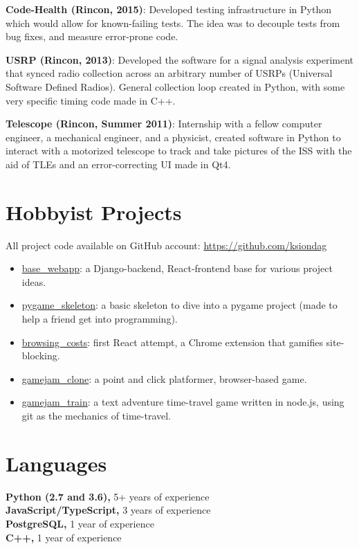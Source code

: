\documentclass{res}
\begin{document}
\begin{resume}
  {\bf Code-Health (Rincon, 2015)}: Developed  testing infrastructure in Python which would allow for 
  known-failing tests. The idea was to decouple tests from bug fixes, and measure error-prone code.

  {\bf USRP (Rincon, 2013)}: Developed the software for a signal analysis experiment that synced radio collection across
  an arbitrary number of USRPs (Universal Software Defined Radios). General collection loop created in Python,
  with some very specific timing code made in C++.

  {\bf Telescope (Rincon, Summer 2011)}: Internship with a fellow computer engineer, a mechanical engineer, and a
  physicist, created software in Python to interact with a motorized telescope to track
  and take pictures of the ISS with the aid of TLEs and an error-correcting UI made in Qt4.
\vspace{0.1in}
    
 
\section{Hobbyist Projects}
All project code available on GitHub account: \url{https://github.com/ksiondag}
  \begin{itemize}
    \item \href{https://github.com/ksiondag/base_webapp}{base\_webapp}: a Django-backend, React-frontend
    base for various project ideas.
    \item \href{https://github.com/ksiondag/pygame_skeleton}{pygame\_skeleton}: a basic skeleton to dive
    into a pygame project (made to help a friend get into programming).
    \item \href{https://github.com/ksiondag/browsing_costs}{browsing\_costs}: first React attempt, a
    Chrome extension that gamifies site-blocking.
    \item \href{https://github.com/ksiondag/gamejam_clone}{gamejam\_clone}: a point and click platformer,
    browser-based game.
    \item \href{https://github.com/ksiondag/gamejam_train}{gamejam\_train}: a text adventure time-travel
    game written in node.js, using git as the mechanics of time-travel.
  \end{itemize}
\vspace{0.1in}

  
\section{Languages} 
\vspace{0.1in}
  {\bf Python (2.7 and 3.6),} 5+ years of experience\\
  {\bf JavaScript/TypeScript,} 3 years of experience\\
  {\bf PostgreSQL,} 1 year of experience\\
  {\bf C++,} 1 year of experience
  

\end{resume}
\end{document}

